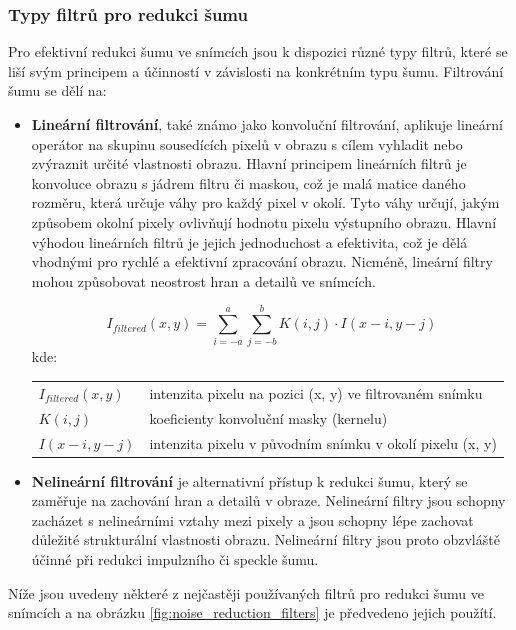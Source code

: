 \documentclass[male,czech,api_ing]{thesis}
\makeatletter
\newenvironment{conditions}[1][kde:]
    {#1 \begin{tabular}[t]{>{$}l<{$} @{${}={}$} >{\raggedright\arraybackslash}p{10cm}}}
    {\end{tabular}}
\makeatother
\begin{document}
\subsubsection{Typy filtrů pro redukci šumu}
Pro efektivní redukci šumu ve snímcích jsou k dispozici různé typy filtrů, které se liší svým principem a účinností v závislosti na konkrétním typu šumu. Filtrování šumu se dělí na:

\begin{itemize}
    \item \textbf{Lineární filtrování}, také známo jako konvoluční filtrování, aplikuje lineární operátor na skupinu sousedících pixelů v obrazu s cílem vyhladit nebo zvýraznit určité vlastnosti obrazu. Hlavní principem lineárních filtrů je konvoluce obrazu s jádrem filtru či maskou, což je malá matice daného rozměru, která určuje váhy pro každý pixel v okolí. Tyto váhy určují, jakým způsobem okolní pixely ovlivňují hodnotu pixelu výstupního obrazu. Hlavní výhodou lineárních filtrů je jejich jednoduchost a efektivita, což je dělá vhodnými pro rychlé a efektivní zpracování obrazu. Nicméně, lineární filtry mohou způsobovat neostrost hran a detailů ve snímcích. \cite{ImageDenoisingTechniques, XRayImageProcessing}
    
    \begin{equation}
        I_{filtered}(x, y) = \sum_{i=-a}^{a} \sum_{j=-b}^{b} K(i, j) \cdot I(x-i, y-j)
    \end{equation}
    \begin{conditions}
        I_{filtered}(x, y) & intenzita pixelu na pozici (x, y) ve filtrovaném snímku \\
        K(i, j) & koeficienty konvoluční masky (kernelu) \\
        I(x-i, y-j) & intenzita pixelu v původním snímku v okolí pixelu (x, y) 
    \end{conditions}
    \item \textbf{Nelineární filtrování} je alternativní přístup k redukci šumu, který se zaměřuje na zachování hran a detailů v obraze. Nelineární filtry jsou schopny zacházet s nelineárními vztahy mezi pixely a jsou schopny lépe zachovat důležité strukturální vlastnosti obrazu. Nelineární filtry jsou proto obzvláště účinné při redukci impulzního či speckle šumu. \cite{ImageDenoisingTechniques, XRayImageProcessing}
\end{itemize}

Níže jsou uvedeny některé z nejčastěji používaných filtrů pro redukci šumu ve snímcích a na obrázku \ref{fig:noise_reduction_filters} je předvedeno jejich použítí.
\end{document}
